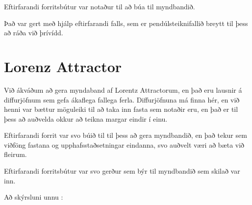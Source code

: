 \documentclass[a4]{article}
\begin{document}
 Eftirfarandi forritsbútur var notaður til að búa til myndbandið.

 Það var gert með hjálp eftirfarandi falls, sem er pendúlsteiknifallið breytt til þess að ráða við þrívídd.


\section{Lorenz Attractor}
Við ákváðum að gera myndaband af Lorentz Attractorum, en það eru lausnir á diffurjöfnum sem gefa ákaflega fallega ferla.
Diffurjöfnuna má finna hér, en við henni var bættur möguleiki til að taka inn fasta sem notaðir eru, en það er til þess
að auðvelda okkur að teikna margar eindir í einu.



Eftirfarandi forrit var svo búið til til þess að gera myndbandið, en það tekur sem viðföng fastana og upphafsstaðsetningar
eindanna, svo auðvelt væri að bæta við fleirum.


Eftirfarandi forritsbútur var svo gerður sem býr til myndbandið sem skilað var inn.


\vspace{20 mm}
Að skýrsluni unnu :
\hspace{0.5cm} \makebox[1.5in]{\hrulefill}
\hspace{0.5cm} \makebox[1.5in]{\hrulefill}
\hspace{0.5cm} \makebox[1.5in]{\hrulefill}
\end{document}
